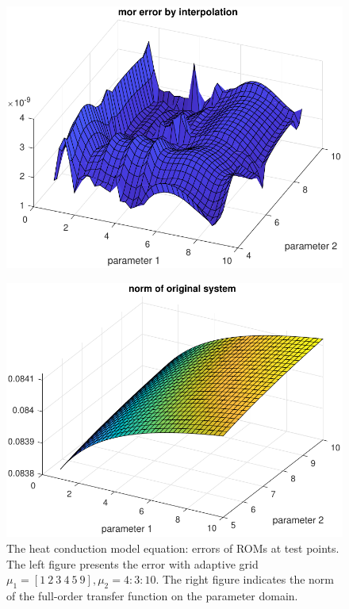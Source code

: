 \begin{figure}[th]
	\begin{minipage}{.5\textwidth}
	\includegraphics[width=\textwidth]{pdfFIG/morerr_interp4.pdf}\\
	\end{minipage}
	\begin{minipage}{.5\textwidth}
		\includegraphics[width=\textwidth]{pdfFIG/nrmorig2.pdf} %
	\end{minipage}
	\caption{The heat conduction model equation: errors of ROMs at test points. The left figure presents the error with adaptive grid $\mu_1 = [1\ 2\ 3\ 4\ 5\ 9], \mu_2 = 4:3:10$. The right figure indicates the norm of the full-order transfer function on the parameter domain.}
	\label{fig:err2_example1}
\end{figure}

